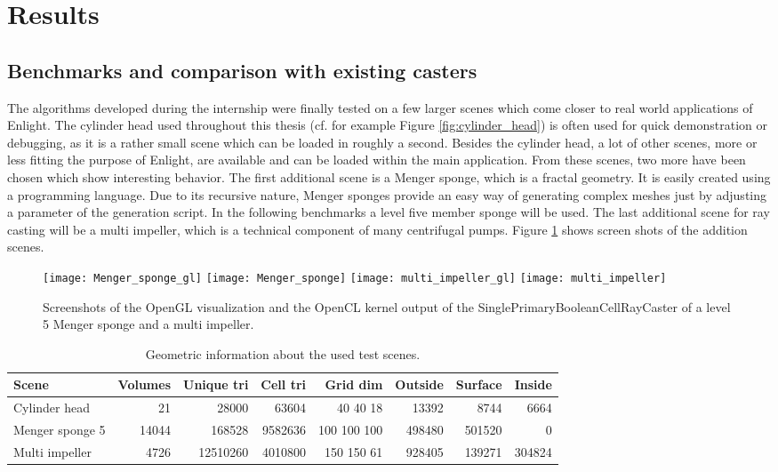 \section{Results}
\label{sec:results}


\subsection{Benchmarks and comparison with existing casters}

The algorithms developed during the internship were finally tested on a few larger scenes which come closer to real world applications of Enlight. The cylinder head used throughout this thesis (cf. for example Figure \ref{fig:cylinder_head}) is often used for quick demonstration or debugging, as it is a rather small scene which can be loaded in roughly a second. Besides the cylinder head, a lot of other scenes, more or less fitting the purpose of Enlight, are available and can be loaded within the main application. From these scenes, two more have been chosen which show interesting behavior. The first additional scene is a Menger sponge, which is a fractal geometry. It is easily created using a programming language. Due to its recursive nature, Menger sponges provide an easy way of generating complex meshes just by adjusting a parameter of the generation script. In the following benchmarks a level five member sponge will be used. The last additional scene for ray casting will be a multi impeller, which is a technical component of many centrifugal pumps. Figure \ref{fig:Menger_sponge_multi_impeller} shows screen shots of the addition scenes.

\begin{figure}
\centering
\texttt{[image: Menger\_sponge\_gl]}
\texttt{[image: Menger\_sponge]}
\texttt{[image: multi\_impeller\_gl]}
\texttt{[image: multi\_impeller]}
\caption{Screenshots of the OpenGL visualization and the OpenCL kernel output of the SinglePrimaryBooleanCellRayCaster of a level 5 Menger sponge and a multi impeller.}
\label{fig:Menger_sponge_multi_impeller}
\end{figure}

\begin{table}[h]
\centering
\begin{tabular}{|l | r r r r r r r|}
\hline
Scene & Volumes & Unique tri & Cell tri & Grid dim & Outside & Surface & Inside \\
\hline
Cylinder head & 21 & 28000 & 63604 & 40 40 18 & 13392 & 8744 & 6664 \\
Menger sponge 5 & 14044 & 168528 & 9582636 & 100 100 100 & 498480 & 501520 & 0 \\
Multi impeller & 4726 & 12510260 & 4010800 & 150 150 61 & 928405 & 139271 & 304824 \\
\hline
\end{tabular}
\caption{Geometric information about the used test scenes.}
\label{tbl:geometrics}
\end{table}

